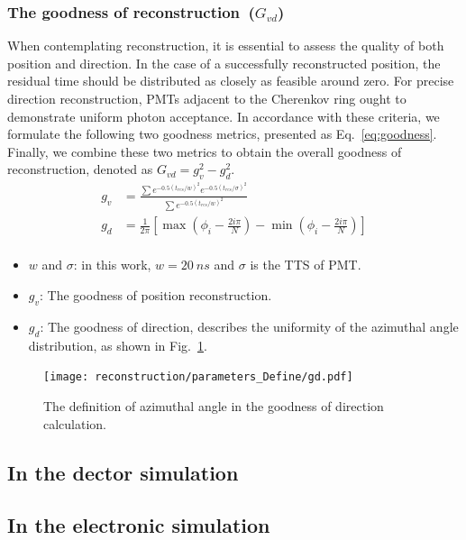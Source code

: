\subsubsection{The goodness of reconstruction~($G_{vd}$)}
When contemplating reconstruction, it is essential to assess the quality of both position and direction. In the case of a successfully reconstructed position, the residual time should be distributed as closely as feasible around zero. For precise direction reconstruction, PMTs adjacent to the Cherenkov ring ought to demonstrate uniform photon acceptance. In accordance with these criteria, we formulate the following two goodness metrics, presented as Eq.~\eqref{eq:goodness}. Finally, we combine these two metrics to obtain the overall goodness of reconstruction, denoted as $G_{vd}=g_v^2-g_d^2$.
\begin{equation}
	\begin{aligned}
		g_v & = \frac{\sum e^{-0.5(t_{res}/w)^2} e^{-0.5(t_{res}/\sigma)^2}}{\sum e^{-0.5(t_{res}/w)^2}}                                \\
		g_d & = \frac{1}{2\pi} \left[ \max\left( \phi_i - \frac{2i\pi}{N} \right) - \min\left( \phi_i - \frac{2i\pi}{N} \right) \right] \\
	\end{aligned}
	\label{eq:goodness}
\end{equation}
\begin{itemize}
	\item $w$ and $\sigma$: in this work, $w=\SI{20}{ns}$ and $\sigma$ is the TTS of PMT.
	\item $g_v$: The goodness of position reconstruction.
	\item $g_d$: The goodness of direction, describes the uniformity of the azimuthal angle distribution, as shown in Fig.~\ref{fig:goodness}.
\end{itemize}
\begin{figure}
	\centering
	\texttt{[image: reconstruction/parameters\_Define/gd.pdf]}
	\caption{The definition of azimuthal angle in the goodness of direction calculation.}
	\label{fig:goodness}
\end{figure}

\subsection{In the dector simulation}
\subsection{In the electronic simulation}
